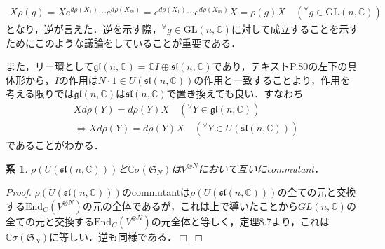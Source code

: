 \documentclass[dvipdfmx]{jsarticle}
\newtheorem{corollary}{系}[section]
\newtheorem{proof}{証明}
\def\qed{\hfill $\Box$}
\begin{document}
\begin{align*}
X\rho(g)=Xe^{d\rho(X_1)}\cdots e^{d\rho(X_m)}=e^{d\rho(X_1)}\cdots e^{d\rho(X_m)}X=\rho(g)X \quad ( ^\forall g\in\mathrm{GL}(n,\mathbb{C}))
\end{align*}
となり，逆が言えた．逆を示す際，$^\forall g\in\mathrm{GL}(n,\mathbb{C})$に対して成立することを示すためにこのような議論をしていることが重要である．\par
また，リー環として$\mathfrak{gl}(n,\mathbb{C})=\mathbb{C}I\oplus \mathfrak{sl}(n,\mathbb{C})$であり，テキストP.80の左下の具体形から，$I$の作用は$N\cdot 1\in U(\mathfrak{sl}(n,\mathbb{C}))$の作用と一致することより，作用を考える限りでは$\mathfrak{gl}(n,\mathbb{C})$は$\mathfrak{sl}(n,\mathbb{C})$で置き換えても良い．すなわち
\begin{align*}
&Xd\rho(Y)=d\rho(Y)X \quad ( ^\forall Y\in \mathfrak{gl}(n,\mathbb{C})) \\
&\Longleftrightarrow Xd\rho(Y)=d\rho(Y)X \quad ( ^\forall Y\in U(\mathfrak{sl}(n,\mathbb{C})))
\end{align*}
であることがわかる．
%
%
%
%
\setcounter{corollary}{8}
\begin{corollary}
$\rho(U(\mathfrak{sl}(n,\mathbb{C})))$と$\mathbb{C}\sigma(\mathfrak{S}_N)$は$V^{\otimes N}$において互いにcommutant．
\end{corollary}
\begin{proof}
$\rho(U(\mathfrak{sl}(n,\mathbb{C})))$のcommutantは$\rho(U(\mathfrak{sl}(n,\mathbb{C})))$の全ての元と交換する$\mathrm{End}_C(V^{\otimes N})$の元の全体であるが，これは上で導いたことから$GL(n,\mathbb{C})$の全ての元と交換する$\mathrm{End}_C(V^{\otimes N})$の元全体と等しく，定理8.7より，これは$\mathbb{C}\sigma(\mathfrak{S}_N)$に等しい．逆も同様である．\qed
\end{proof}
%
%
%
%
\end{document}

